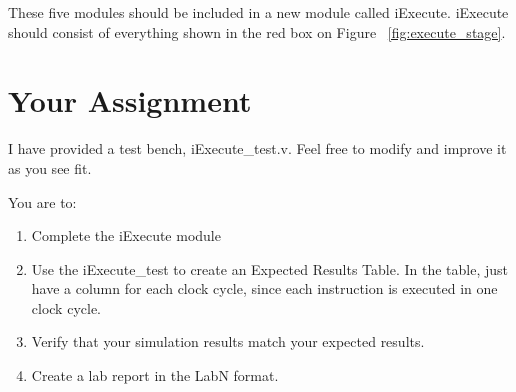 These five modules should be included in a new module called iExecute.  iExecute should consist of everything shown in the red box on Figure ~\ref{fig:execute_stage}. 

\section{Your Assignment}
I have provided a test bench, iExecute\_test.v.  Feel free to modify and improve it as you see fit.


You are to:
\begin{enumerate}
\item Complete the iExecute module 
\item Use the iExecute\_test to create an Expected Results Table.  In the table, just have a column for each clock cycle, since each instruction is executed in one clock cycle.
\item Verify that your simulation results match your expected results.
\item Create a lab report in the LabN format.
\end{enumerate} 